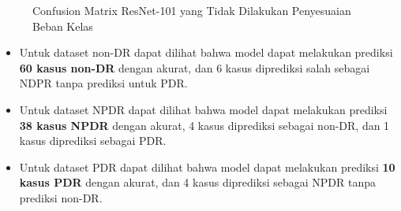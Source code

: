 \begin{figure}[hbtp]
	\centering
	\qquad
	\qquad
	\caption{Confusion Matrix ResNet-101 yang Tidak Dilakukan Penyesuaian Beban Kelas}
	\label{fig:confRes101}
\end{figure}

\begin{itemize}
	\item Untuk dataset non-DR dapat dilihat bahwa model dapat melakukan prediksi \textbf{60 kasus non-DR} dengan akurat, dan 6 kasus diprediksi salah sebagai NDPR tanpa prediksi untuk PDR.
	
	\item Untuk dataset NPDR dapat dilihat bahwa model dapat melakukan prediksi \textbf{38 kasus NPDR} dengan akurat, 4 kasus diprediksi sebagai non-DR, dan 1 kasus diprediksi sebagai PDR.
	
	\item Untuk dataset PDR dapat dilihat bahwa model dapat melakukan prediksi \textbf{10 kasus PDR} dengan akurat, dan 4 kasus diprediksi sebagai NPDR tanpa prediksi non-DR.
\end{itemize}
\pagebreak

